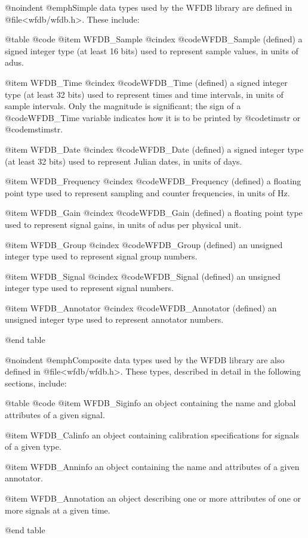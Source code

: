 {{{{{{{{{{@noindent
@emph{Simple data types} used by the WFDB library are defined in
@file{<wfdb/wfdb.h>}.  These include:

@table @code
@item WFDB_Sample
@cindex @code{WFDB_Sample} (defined)
a signed integer type (at least 16 bits) used to represent sample
values, in units of adus.

@item WFDB_Time
@cindex @code{WFDB_Time} (defined)
a signed integer type (at least 32 bits) used to represent times and
time intervals, in units of sample intervals.  Only the magnitude is
significant;  the sign of a @code{WFDB_Time} variable indicates how it
is to be printed by @code{timstr} or @code{mstimstr}.

@item WFDB_Date
@cindex @code{WFDB_Date} (defined)
a signed integer type (at least 32 bits) used to represent Julian dates,
in units of days.

@item WFDB_Frequency
@cindex @code{WFDB_Frequency} (defined)
a floating point type used to represent sampling and counter
frequencies, in units of Hz.

@item WFDB_Gain
@cindex @code{WFDB_Gain} (defined)
a floating point type used to represent signal gains, in units of adus
per physical unit.

@item WFDB_Group
@cindex @code{WFDB_Group} (defined)
an unsigned integer type used to represent signal group numbers.

@item WFDB_Signal
@cindex @code{WFDB_Signal} (defined)
an unsigned integer type used to represent signal numbers.

@item WFDB_Annotator
@cindex @code{WFDB_Annotator} (defined)
an unsigned integer type used to represent annotator numbers.

@end table

@noindent
@emph{Composite data types} used by the WFDB library are also defined in
@file{<wfdb/wfdb.h>}.  These types, described in detail in the following
sections, include:

@table @code
@item WFDB_Siginfo
an object containing the name and global attributes of a given signal.

@item WFDB_Calinfo
an object containing calibration specifications for signals of a given
type.

@item WFDB_Anninfo
an object containing the name and attributes of a given annotator.

@item WFDB_Annotation
an object describing one or more attributes of one or more signals at a
given time.

@end table

}}}}}}}}}}
